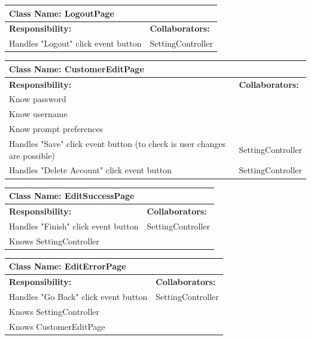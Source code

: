 \documentclass[]{article}
\begin{document}
	\begin{table}[H]
	\centering
	\begin{tabular}{|p{6cm}|p{6cm}|}
	\hline 
		\multicolumn{2}{|l|}{\textbf{Class Name: LogoutPage}} \\
	\hline
	\textbf{Responsibility:} & \textbf{Collaborators:} \\
	\hline 
	Handles "Logout" click event button & SettingController\\ \hline
	\end{tabular}
	\end{table}
	
	
	\begin{table}[H]
	\centering
	\begin{tabular}{|p{6cm}|p{6cm}|}
	\hline 
		\multicolumn{2}{|l|}{\textbf{Class Name: CustomerEditPage}} \\
	\hline
	\textbf{Responsibility:} & \textbf{Collaborators:} \\
	\hline 
	Know password & \\ \hline
	Know username & \\ \hline
	Know prompt preferences & \\ \hline
	Handles "Save" click event button (to check is user changes are possible) & SettingController\\ \hline 
	Handles "Delete Account" click event button & SettingController\\ \hline
	\end{tabular}
	\end{table}
	
	\begin{table}[H]
	\centering
	\begin{tabular}{|p{6cm}|p{6cm}|}
	\hline 
		\multicolumn{2}{|l|}{\textbf{Class Name: EditSuccessPage}} \\
	\hline
	\textbf{Responsibility:} & \textbf{Collaborators:} \\
	\hline 
	Handles "Finish" click event button & SettingController\\ \hline 
	Knows SettingController &\\ \hline
	\end{tabular}
	\end{table}
	
	\begin{table}[H]
	\centering
	\begin{tabular}{|p{6cm}|p{6cm}|}
	\hline 
		\multicolumn{2}{|l|}{\textbf{Class Name: EditErrorPage}} \\
	\hline
	\textbf{Responsibility:} & \textbf{Collaborators:} \\
	\hline 
	Handles "Go Back" click event button & SettingController\\ \hline 
	Knows SettingController &\\ \hline
	Knows CustomerEditPage &\\ \hline
	\end{tabular}
	\end{table}
	
\end{document}
